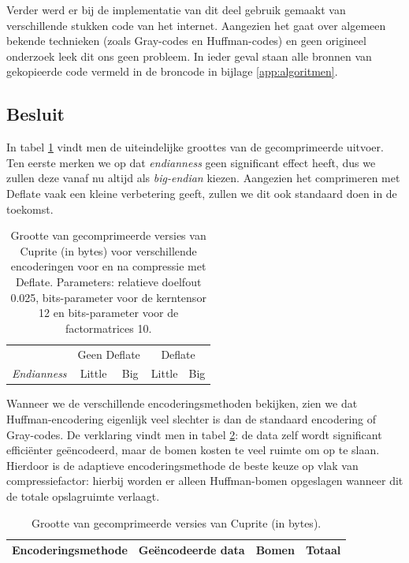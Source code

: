 Verder werd er bij de implementatie van dit deel gebruik gemaakt van verschillende stukken code van het internet. Aangezien het gaat over algemeen bekende technieken (zoals Gray-codes en Huffman-codes) en geen origineel onderzoek leek dit ons geen probleem. In ieder geval staan alle bronnen van gekopieerde code vermeld in de broncode in bijlage \ref{app:algoritmen}.

\subsection{Besluit}

In tabel \ref{table:encoding-comparison1} vindt men de uiteindelijke groottes van de gecomprimeerde uitvoer. Ten eerste merken we op dat \textit{endianness} geen significant effect heeft, dus we zullen deze vanaf nu altijd als \textit{big-endian} kiezen. Aangezien het comprimeren met Deflate vaak een kleine verbetering geeft, zullen we dit ook standaard doen in de toekomst.\\

\begin{table}[H]
\centering
\begin{tabular}{|l|c|c|c|c|}
\hline
& \multicolumn{2}{c|}{Geen Deflate} & \multicolumn{2}{c|}{Deflate} \\ \cline{1-5} 
\textit{Endianness} & Little & Big & Little & Big \\ \hline
                             
\end{tabular}
\caption{Grootte van gecomprimeerde versies van Cuprite (in bytes) voor verschillende encoderingen voor en na compressie met Deflate. Parameters: relatieve doelfout 0.025, bits-parameter voor de kerntensor 12 en bits-parameter voor de factormatrices 10.}
\label{table:encoding-comparison1}
\end{table}

Wanneer we de verschillende encoderingsmethoden bekijken, zien we dat Huffman-encodering eigenlijk veel slechter is dan de standaard encodering of Gray-codes. De verklaring vindt men in tabel \ref{table:encoding-comparison2}: de data zelf wordt significant effici\"enter ge\"encodeerd, maar de bomen kosten te veel ruimte om op te slaan. Hierdoor is de adaptieve encoderingsmethode de beste keuze op vlak van compressiefactor: hierbij worden er alleen Huffman-bomen opgeslagen wanneer dit de totale opslagruimte verlaagt.

\newpage
\begin{table}[H]
\centering
\begin{tabular}{|l|c|c|c|}
\hline
Encoderingsmethode & Ge\"encodeerde data & Bomen & Totaal \\ \hline
                             
\end{tabular}
\caption{Grootte van gecomprimeerde versies van Cuprite (in bytes).}
\label{table:encoding-comparison2}
\end{table}

